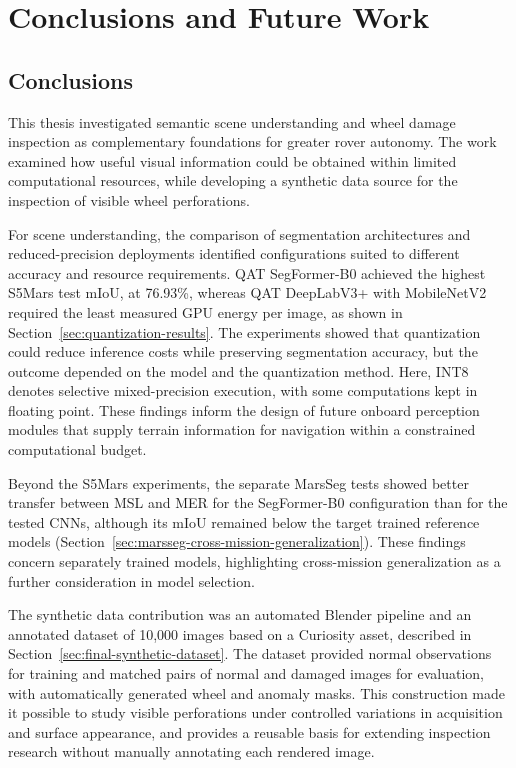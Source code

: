 \chapter{Conclusions and Future Work}\label{chap:conclusions-future-work}

\section{Conclusions}
\label{sec:conclusions}

This thesis investigated semantic scene understanding and wheel damage inspection as complementary foundations for greater rover autonomy. The work examined how useful visual information could be obtained within limited computational resources, while developing a synthetic data source for the inspection of visible wheel perforations.

For scene understanding, the comparison of segmentation architectures and reduced-precision deployments identified configurations suited to different accuracy and resource requirements. QAT SegFormer-B0 achieved the highest S5Mars test mIoU, at 76.93\%, whereas QAT DeepLabV3+ with MobileNetV2 required the least measured GPU energy per image, as shown in Section~\ref{sec:quantization-results}. The experiments showed that quantization could reduce inference costs while preserving segmentation accuracy, but the outcome depended on the model and the quantization method. Here, INT8 denotes selective mixed-precision execution, with some computations kept in floating point. These findings inform the design of future onboard perception modules that supply terrain information for navigation within a constrained computational budget.

Beyond the S5Mars experiments, the separate MarsSeg tests showed better transfer between MSL and MER for the SegFormer-B0 configuration than for the tested CNNs, although its mIoU remained below the target trained reference models (Section~\ref{sec:marsseg-cross-mission-generalization}). These findings concern separately trained models, highlighting cross-mission generalization as a further consideration in model selection.

The synthetic data contribution was an automated Blender pipeline and an annotated dataset of 10,000 images based on a Curiosity asset, described in Section~\ref{sec:final-synthetic-dataset}. The dataset provided normal observations for training and matched pairs of normal and damaged images for evaluation, with automatically generated wheel and anomaly masks. This construction made it possible to study visible perforations under controlled variations in acquisition and surface appearance, and provides a reusable basis for extending inspection research without manually annotating each rendered image.

